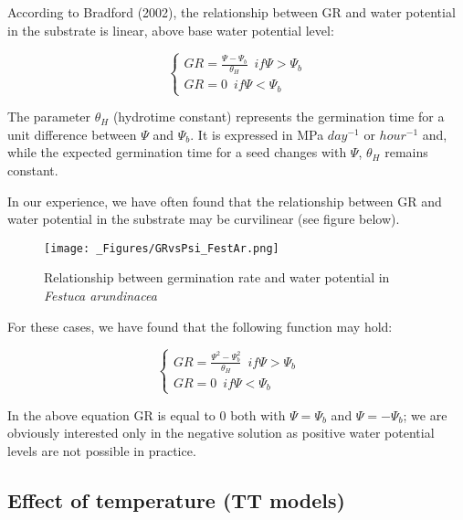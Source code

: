 \documentclass[a4paper,12pt]{article}
\begin{document}
According to Bradford (2002), the relationship between GR and water
potential in the substrate is linear, above base water potential level:

\begin{equation}
\left\{ {\begin{array}{*{20}{l}}
    GR = \frac{\Psi - \Psi_b}{\theta_H} \,\,\, if \Psi > \Psi_b\\
    GR = 0 \,\,\, if \Psi < \Psi_b
\end{array}} \right.
\end{equation}

The parameter \(\theta_H\) (hydrotime constant) represents the
germination time for a unit difference between \(\Psi\) and \(\Psi_b\).
It is expressed in MPa \(day^{-1}\) or \(hour^{-1}\) and, while the
expected germination time for a seed changes with \(\Psi\), \(\theta_H\)
remains constant.

In our experience, we have often found that the relationship between GR
and water potential in the substrate may be curvilinear (see figure
below).

\begin{figure}[htbp]
\begin{center}
\texttt{[image: \_Figures/GRvsPsi\_FestAr.png]}
\caption{Relationship between germination rate and water potential in \textit{Festuca arundinacea}}
\label{Label}
\end{center}
\end{figure}

For these cases, we have found that the following function may hold:

\begin{equation}
\left\{ {\begin{array}{*{20}{l}}
    GR = \frac{\Psi^2 - \Psi_b^2}{\theta_H} \,\,\, if \Psi > \Psi_b\\
    GR = 0 \,\,\, if \Psi < \Psi_b
\end{array}} \right. \,\,\,\,\,\,\,\,
\end{equation}

In the above equation GR is equal to 0 both with \(\Psi = \Psi_b\) and
\(\Psi = -\Psi_b\); we are obviously interested only in the negative
solution as positive water potential levels are not possible in
practice.

\subsection{Effect of temperature (TT
models)}\label{effect-of-temperature-tt-models}
\end{document}
